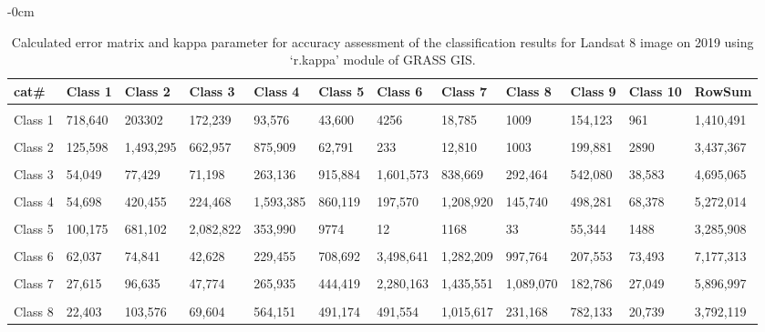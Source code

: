 \documentclass[analytics,article,accept,pdftex,moreauthors]{Definitions/mdpi}
\begin{document}
\begin{table}[H] 
    \caption{Calculated error matrix and kappa parameter for accuracy assessment of the classification results for Landsat 8 image on 2019 using `r.kappa' module of GRASS GIS.}%
    \begin{adjustwidth}{-\extralength}{0cm}
 	\begin{tabularx}{\fulllength}{lllllllllllL}
    \toprule
        \textbf{cat\#} & \textbf{Class 1} & \textbf{Class 2} & \textbf{Class 3} & \textbf{Class 4} & \textbf{Class 5} & \textbf{Class 6} & \textbf{Class 7} & \textbf{Class 8} & \textbf{Class 9} & \textbf{Class 10} & \textbf{RowSum} \\ \hline
      &&&&&&&&&&&\\[-2ex]
        Class 1 & 718,640 & 203302 & 172,239 & 93,576 & 43,600 & 4256 & 18,785 & 1009 & 154,123 & 961 & 1,410,491 \\ \hline
      &&&&&&&&&&&\\[-2ex]
        Class 2 & 125,598 & 1,493,295 & 662,957 & 875,909 & 62,791 & 233 & 12,810 & 1003 & 199,881 & 2890 & 3,437,367 \\ \hline
      &&&&&&&&&&&\\[-2ex]
        Class 3 & 54,049 & 77,429 & 71,198 & 263,136 & 915,884 & 1,601,573 & 838,669 & 292,464 & 542,080 & 38,583 & 4,695,065 \\ \hline
      &&&&&&&&&&&\\[-2ex]
        Class 4 & 54,698 & 420,455 & 224,468 & 1,593,385 & 860,119 & 197,570 & 1,208,920 & 145,740 & 498,281 & 68,378 & 5,272,014 \\ \hline
      &&&&&&&&&&&\\[-2ex]
        Class 5 & 100,175 & 681,102 & 2,082,822 & 353,990 & 9774 & 12 & 1168 & 33 & 55,344 & 1488 & 3,285,908 \\ \hline
      &&&&&&&&&&&\\[-2ex]
        Class 6 & 62,037 & 74,841 & 42,628 & 229,455 & 708,692 & 3,498,641 & 1,282,209 & 997,764 & 207,553 & 73,493 & 7,177,313 \\ \hline
      &&&&&&&&&&&\\[-2ex]
        Class 7 & 27,615 & 96,635 & 47,774 & 265,935 & 444,419 & 2,280,163 & 1,435,551 & 1,089,070 & 182,786 & 27,049 & 5,896,997 \\ \hline
      &&&&&&&&&&&\\[-2ex]
        Class 8 & 22,403 & 103,576 & 69,604 & 564,151 & 491,174 & 491,554 & 1,015,617 & 231,168 & 782,133 & 20,739 & 3,792,119 \\ \hline

\end{tabularx}
\end{adjustwidth}
\end{table}
\end{document}
